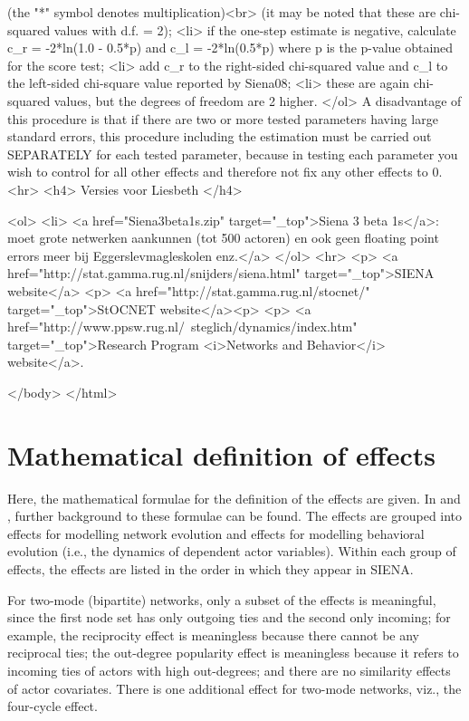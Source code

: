 \documentclass[a4paper,fleqn]{article}
\newcommand{\+}{\, + \,}
\newcommand{\si}{{\sf SIENA}}
\begin{document}
{     (the "*" symbol denotes multiplication)<br>
     (it may be noted that these are chi-squared values with d.f. = 2);
<li> if the one-step estimate is negative, calculate
     c_r = -2*ln(1.0 - 0.5*p) and c_l = -2*ln(0.5*p)
     where p is the p-value obtained for the score test;
<li> add c_r to the right-sided chi-squared value
     and c_l to the left-sided chi-square value reported by Siena08;
<li> these are again chi-squared values, but the degrees of freedom are 2 higher.
</ol>
A disadvantage of this procedure is that if there are two or more
tested parameters having large standard errors, this procedure including the estimation
must be carried out SEPARATELY for each tested parameter, because in testing each parameter
you wish to control for all other effects and therefore not fix any other
effects to 0.
<hr>
<h4>
Versies voor Liesbeth
</h4>

<ol>
<li> <a href="Siena3beta1s.zip" target="_top">Siena 3 beta 1s</a>: moet grote netwerken aankunnen (tot 500 actoren)
   en ook geen floating point errors meer bij Eggerslevmagleskolen enz.</a>
</ol>
<hr>
<p>
<a href="http://stat.gamma.rug.nl/snijders/siena.html" target="_top">SIENA website</a>
<p>
<a href="http://stat.gamma.rug.nl/stocnet/" target="_top">StOCNET website</a><p>
<p>
<a href="http://www.ppsw.rug.nl/~steglich/dynamics/index.htm" target="_top">Research Program
<i>Networks and Behavior</i> website</a>.

</body>
</html>
\fi


\begin{print}
\newpage
\end{print}
\section[Formulas for effects]{Mathematical definition of effects}
\label{S_math}


Here, the mathematical formulae for the definition of the effects
are given. In \citet{Snijders01,Snijders05} and \citet*{SteglichEA10},
further background to these formulae can be found.
The effects are grouped into effects for modelling network
evolution and effects for modelling behavioral evolution (i.e.,
the dynamics of dependent actor variables). Within each group of
effects, the effects are listed in the order in which they appear
in \si.

For two-mode (bipartite) networks, only a subset of the effects is
meaningful, since the first node set has only outgoing ties
and the second only incoming; for example, the reciprocity effect
is meaningless because there cannot be any reciprocal ties;
the out-degree popularity effect is meaningless because it refers to
incoming ties of actors with high out-degrees; and there are no similarity
effects of actor covariates.
There is one additional effect for two-mode networks, viz.,
the four-cycle effect.

}
\end{document}
